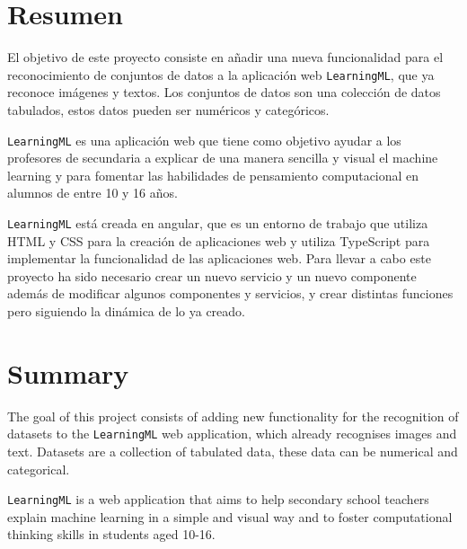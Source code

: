\documentclass[a4paper, 12pt]{book}
\begin{document}

\chapter*{Resumen}

El objetivo de este proyecto consiste en añadir una nueva funcionalidad para el reconocimiento de conjuntos de datos a la aplicación web \texttt{LearningML}, que ya reconoce imágenes y textos. Los conjuntos de datos son una colección de datos tabulados, estos datos pueden ser numéricos y categóricos.

\texttt{LearningML} es una aplicación web que tiene como objetivo ayudar a los profesores de secundaria a explicar de una manera sencilla y visual el machine learning y para fomentar las habilidades de pensamiento computacional en alumnos de entre 10 y 16 años.

\texttt{LearningML} está creada en angular, que es un entorno de trabajo que utiliza HTML y CSS para la creación de aplicaciones web y utiliza TypeScript para implementar la funcionalidad de las aplicaciones web. Para llevar a cabo este proyecto ha sido necesario crear un nuevo servicio y un nuevo componente además de modificar algunos componentes y servicios, y crear distintas funciones pero siguiendo la dinámica de lo ya creado.


\chapter*{Summary}

The goal of this project consists of adding new functionality for the recognition of datasets to the \texttt{LearningML} web application, which already recognises images and text. Datasets are a collection of tabulated data, these data can be numerical and categorical.

\texttt{LearningML} is a web application that aims to help secondary school teachers explain machine learning in a simple and visual way and to foster computational thinking skills in students aged 10-16.
\end{document}
